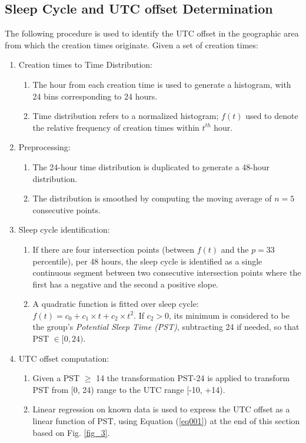 \subsection{Sleep Cycle and UTC offset Determination} \label{subsec-UTC} %

The following procedure is used to identify the UTC offset in the geographic area from which the creation times originate. Given a set of creation times:

\begin{enumerate}
\item Creation times to Time Distribution:
\begin{enumerate}
    \item 
The hour from each creation time is used to generate a histogram, with 24 bins corresponding to 24 hours. 
\item 
Time distribution refers to a normalized histogram; $f(t)$ used to denote the relative frequency of creation times within $t^{th}$ hour. 
\end{enumerate}
\item Preprocessing:
\begin{enumerate}
    \item 
The 24-hour time distribution is duplicated to generate a 48-hour distribution.
\item The distribution is smoothed by computing the moving average of $n=5$ consecutive points.%
\end{enumerate}
\item Sleep cycle identification:
\begin{enumerate}
    \item 
If there are four intersection points (between $f(t)$ and the $p=33$ percentile),
per 48 hours, the sleep cycle is identified as a single continuous segment between  
two consecutive intersection points where the first has a negative and the second a positive slope. %
\item A quadratic %
function is fitted over sleep cycle: $f(t) = c_0 + c_1\times t + c_2 \times t^2$. %
If $c_2 > 0$, its minimum is considered to be the group's \textit{Potential Sleep Time (PST)}, subtracting 24 if needed, so that PST $\in [ 0, 24)$. 
\end{enumerate}
\item UTC offset computation:
\begin{enumerate}
    \item 
Given a PST $\geq$ 14 the               transformation PST-24 is applied to transform  PST from [0, 24) range to the UTC range [-10, +14).
\item 
Linear regression on known data is used to express the UTC offset as a linear function of PST, using Equation (\ref{eq001}) at the end of this section based on Fig. \ref{fig_3}.
\end{enumerate}
\end{enumerate}

